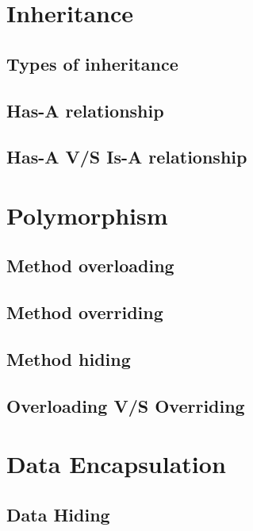 \documentclass[14pt,fleqn]{extbook} %
\begin{document}
\section{Inheritance}

\subsection{Types of inheritance}

%
\subsection{Has-A relationship}

\subsection{Has-A V/S Is-A relationship}

\section{Polymorphism}

\subsection{Method overloading}

\subsection{Method overriding}

\subsection{Method hiding}

\subsection{Overloading V/S Overriding}

\section{Data Encapsulation}

\subsection{Data Hiding}

\end{document}
